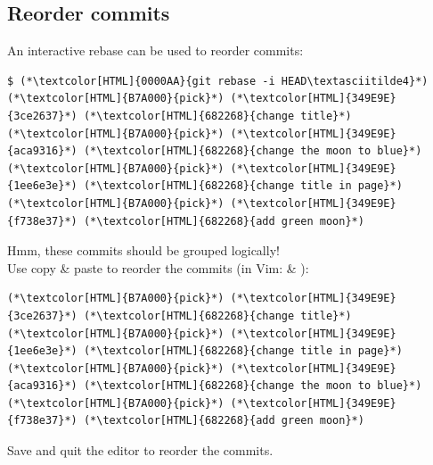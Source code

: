 \subsection{Reorder commits}
\begin{frame}[fragile]
  \subslidetitle
  An interactive rebase can be used to reorder commits:

  \begin{lstlisting}
$ (*\textcolor[HTML]{0000AA}{git rebase -i HEAD\textasciitilde4}*)
(*\textcolor[HTML]{B7A000}{pick}*) (*\textcolor[HTML]{349E9E}{3ce2637}*) (*\textcolor[HTML]{682268}{change title}*)
(*\textcolor[HTML]{B7A000}{pick}*) (*\textcolor[HTML]{349E9E}{aca9316}*) (*\textcolor[HTML]{682268}{change the moon to blue}*)
(*\textcolor[HTML]{B7A000}{pick}*) (*\textcolor[HTML]{349E9E}{1ee6e3e}*) (*\textcolor[HTML]{682268}{change title in page}*)
(*\textcolor[HTML]{B7A000}{pick}*) (*\textcolor[HTML]{349E9E}{f738e37}*) (*\textcolor[HTML]{682268}{add green moon}*)
\end{lstlisting}

  Hmm, these commits should be grouped logically!\\
  Use copy \& paste to reorder the commits (in Vim:  \& ):

  \begin{lstlisting}
(*\textcolor[HTML]{B7A000}{pick}*) (*\textcolor[HTML]{349E9E}{3ce2637}*) (*\textcolor[HTML]{682268}{change title}*)
(*\textcolor[HTML]{B7A000}{pick}*) (*\textcolor[HTML]{349E9E}{1ee6e3e}*) (*\textcolor[HTML]{682268}{change title in page}*)
(*\textcolor[HTML]{B7A000}{pick}*) (*\textcolor[HTML]{349E9E}{aca9316}*) (*\textcolor[HTML]{682268}{change the moon to blue}*)
(*\textcolor[HTML]{B7A000}{pick}*) (*\textcolor[HTML]{349E9E}{f738e37}*) (*\textcolor[HTML]{682268}{add green moon}*)
\end{lstlisting}

  Save and quit the editor to reorder the commits.
\end{frame}


